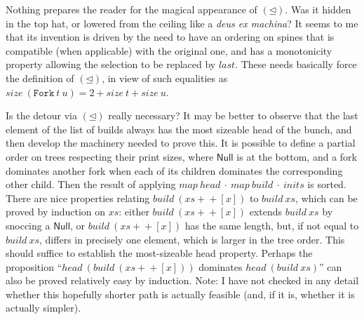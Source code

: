
Nothing prepares the reader for the magical appearance of $(\unlhd)$. Was it hidden in the top hat, or lowered from the ceiling like a \emph{deus ex machina}? It seems to me that its invention is driven by the need to have an ordering on spines that is compatible (when applicable) with the original one, and has a monotonicity property allowing the selection to be replaced by $last$. These needs basically force the definition of $(\unlhd)$, in view of such equalities as $size~(\mathtt{Fork}~t~u) = 2 + size~t + size~u$.

Is the detour via $(\unlhd)$ really necessary? It may be better to observe that the last element of the list of builds always has the most sizeable head of the bunch, and then develop the machinery needed to prove this. It is possible to define a partial order on trees respecting their print sizes, where $\mathsf{Null}$ is at the bottom, and a fork dominates another fork when each of its children dominates the corresponding other child. Then the result of applying $map~head~\cdot~map~build~\cdot~inits$ is sorted. There are nice properties relating $build~(xs +\!\!\!\!+ [x])$ to $build~xs$, which can be proved by induction on $xs$: either $build~(xs +\!\!\!\!+ [x])$ extends $build~xs$ by snoccing a $\mathsf{Null}$, or $build~(xs +\!\!\!\!+ [x])$ has the same length, but, if not equal to $build~xs$, differs in precisely one element, which is larger in the tree order. This should suffice to establish the most-sizeable head property. Perhaps the proposition ``$head~(build~(xs +\!\!\!\!+ [x]))$ dominates $head~(build~xs)$'' can also be proved relatively easy by induction. Note: I have not checked in any detail whether this hopefully shorter path is actually feasible (and, if it is, whether it is actually simpler).


